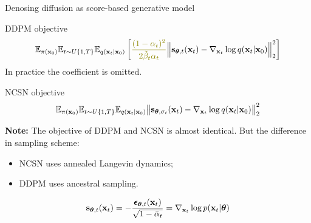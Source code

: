 \begin{frame}{Denosing diffusion as score-based generative model}
	\begin{block}{DDPM objective}
		\vspace{-0.5cm}
		\[
			\bbE_{\pi(\bx_0)} \bbE_{t \sim U\{1, T\}}\bbE_{q(\bx_t | \bx_0)} \left[ {\color{olive}\frac{(1 - \alpha_t)^2}{2\tilde{\beta}_t \alpha_t}} \Bigl\|  \bs_{\btheta, t} (\bx_t) - \nabla_{\bx_t} \log q(\bx_t | \bx_0) \Bigr\|_2^2  \right]
		\]
		In practice {\color{olive}the coefficient} is omitted.
	\end{block}
	\begin{block}{NCSN objective}
		\vspace{-0.3cm}
		\[
			\mathbb{E}_{\pi(\mathbf{x}_0)} \mathbb{E}_{t \sim U\{1, T\}} \mathbb{E}_{q(\mathbf{x}_t | \mathbf{x}_0)}\bigl\| \mathbf{s}_{\boldsymbol{\theta}, \sigma_t}(\mathbf{x}_t) - \nabla_{\mathbf{x}_t} \log q(\mathbf{x}_t | \mathbf{x}_0) \bigr\|^2_2 
		\]
		\vspace{-0.3cm}
	\end{block}
	\textbf{Note:} The objective of DDPM and NCSN is almost identical. But the difference in sampling scheme:
	\begin{itemize}
		\item NCSN uses annealed Langevin dynamics;
		\item DDPM uses ancestral sampling.
	\end{itemize}
	\[
		\mathbf{s}_{\boldsymbol{\theta}, t}(\mathbf{x}_t) = - \frac{\boldsymbol{\epsilon}_{\boldsymbol{\theta}, t}(\mathbf{x}_t)}{\sqrt{1 - \bar{\alpha}_t}} = \nabla_{\mathbf{x}_t} \log p(\mathbf{x}_t | \boldsymbol{\theta})
	\]
	\end{frame}
